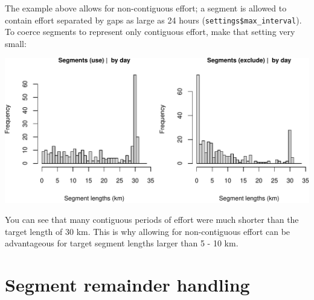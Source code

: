 \documentclass[
]{book}
\newenvironment{Shaded}{\begin{snugshade}}{\end{snugshade}}
\newcommand{\CommentTok}[1]{\textcolor[rgb]{0.56,0.35,0.01}{\textit{#1}}}
\newcommand{\DataTypeTok}[1]{\textcolor[rgb]{0.13,0.29,0.53}{#1}}
\newcommand{\DecValTok}[1]{\textcolor[rgb]{0.00,0.00,0.81}{#1}}
\newcommand{\FloatTok}[1]{\textcolor[rgb]{0.00,0.00,0.81}{#1}}
\newcommand{\KeywordTok}[1]{\textcolor[rgb]{0.13,0.29,0.53}{\textbf{#1}}}
\newcommand{\NormalTok}[1]{#1}
\newcommand{\OperatorTok}[1]{\textcolor[rgb]{0.81,0.36,0.00}{\textbf{#1}}}
\newcommand{\OtherTok}[1]{\textcolor[rgb]{0.56,0.35,0.01}{#1}}
\newcommand{\StringTok}[1]{\textcolor[rgb]{0.31,0.60,0.02}{#1}}
\begin{document}
The example above allows for non-contiguous effort; a segment is allowed to contain effort separated by gaps as large as 24 hours (\texttt{settings\$max\_interval}). To coerce segments to represent only contiguous effort, make that setting very small:

\begin{Shaded}
\end{Shaded}

\includegraphics{figures/unnamed-chunk-380-1.pdf}

You can see that many contiguous periods of effort were much shorter than the target length of 30 km. This is why allowing for non-contiguous effort can be advantageous for target segment lengths larger than 5 - 10 km.

\hypertarget{segment-remainder-handling}{%
\section*{Segment remainder handling}\label{segment-remainder-handling}}
\end{document}
